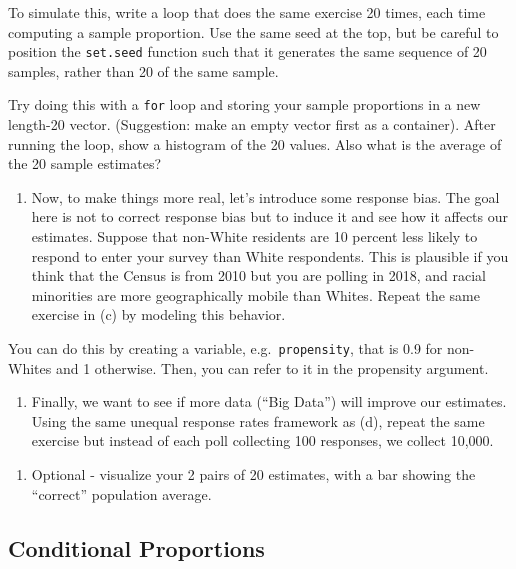 \documentclass[
  letterpaper,
]{book}
\providecommand{\tightlist}{%
  \setlength{\itemsep}{0pt}\setlength{\parskip}{0pt}}\usepackage{longtable,booktabs,array}
\theoremstyle{definition}
\theoremstyle{definition}
\theoremstyle{plain}
\theoremstyle{definition}
\theoremstyle{plain}
\theoremstyle{plain}
\theoremstyle{remark}
\begin{document}
To simulate this, write a loop that does the same exercise 20 times,
each time computing a sample proportion. Use the same seed at the top,
but be careful to position the \texttt{set.seed} function such that it
generates the same sequence of 20 samples, rather than 20 of the same
sample.

Try doing this with a \texttt{for} loop and storing your sample
proportions in a new length-20 vector. (Suggestion: make an empty vector
first as a container). After running the loop, show a histogram of the
20 values. Also what is the average of the 20 sample estimates?

\begin{enumerate}
\def\labelenumi{(\alph{enumi})}
\setcounter{enumi}{3}
\tightlist
\item
  Now, to make things more real, let's introduce some response bias. The
  goal here is not to correct response bias but to induce it and see how
  it affects our estimates. Suppose that non-White residents are 10
  percent less likely to respond to enter your survey than White
  respondents. This is plausible if you think that the Census is from
  2010 but you are polling in 2018, and racial minorities are more
  geographically mobile than Whites. Repeat the same exercise in (c) by
  modeling this behavior.
\end{enumerate}

You can do this by creating a variable, e.g.~\texttt{propensity}, that
is 0.9 for non-Whites and 1 otherwise. Then, you can refer to it in the
propensity argument.

\begin{enumerate}
\def\labelenumi{(\alph{enumi})}
\setcounter{enumi}{4}
\tightlist
\item
  Finally, we want to see if more data (``Big Data'') will improve our
  estimates. Using the same unequal response rates framework as (d),
  repeat the same exercise but instead of each poll collecting 100
  responses, we collect 10,000.
\end{enumerate}

\begin{enumerate}
\def\labelenumi{(\alph{enumi})}
\setcounter{enumi}{5}
\tightlist
\item
  Optional - visualize your 2 pairs of 20 estimates, with a bar showing
  the ``correct'' population average.
\end{enumerate}

\hypertarget{conditional-proportions}{%
\subsection*{Conditional Proportions}\label{conditional-proportions}}
\end{document}
